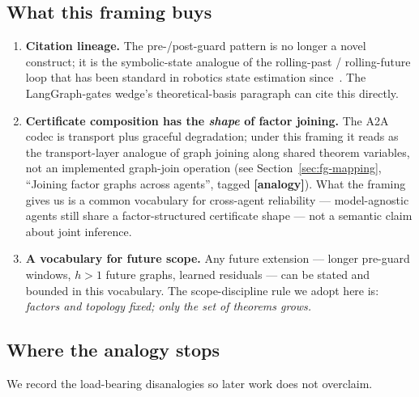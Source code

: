 \subsection{What this framing buys}\label{sec:fg-buys}

\begin{enumerate}[leftmargin=*,itemsep=2pt,topsep=2pt]
\item \textbf{Citation lineage.}  The pre-/post-guard pattern is no
  longer a novel construct; it is the symbolic-state analogue of the
  rolling-past / rolling-future loop that has been standard in
  robotics state estimation since~\cite{kaess2012isam2}.  The
  LangGraph-gates wedge's theoretical-basis paragraph can cite this
  directly.
\item \textbf{Certificate composition has the \emph{shape} of
  factor joining.}  The A2A codec is transport plus graceful
  degradation; under this framing it reads as the transport-layer
  analogue of graph joining along shared theorem variables, not an
  implemented graph-join operation (see
  Section~\ref{sec:fg-mapping}, ``Joining factor graphs across
  agents'', tagged \textbf{[analogy]}).  What the framing gives us
  is a common vocabulary for cross-agent reliability ---
  model-agnostic agents still share a factor-structured
  certificate shape --- not a semantic claim about joint
  inference.
\item \textbf{A vocabulary for future scope.}  Any future extension
  --- longer pre-guard windows, $h > 1$ future graphs, learned
  residuals --- can be stated and bounded in this vocabulary.  The
  scope-discipline rule we adopt here is: \emph{factors and
  topology fixed; only the set of theorems grows.}
\end{enumerate}

\subsection{Where the analogy stops}\label{sec:fg-limits}

We record the load-bearing disanalogies so later work does not
overclaim.

